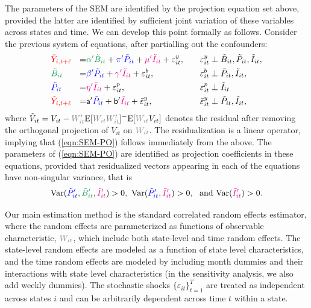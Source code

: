 \documentclass[11pt,reqno,letter]{amsart}
\theoremstyle{definition}
\providecommand{\Var}{{\mathrm{Var}}}
\newcommand{\Ep}{{\mathrm{E}}}
\def\bcolor{\color{ForestGreen}}
\def\pcolor{\color{blue}}
\def\icolor{\color{magenta}}
\def\wcolor{\color{gray}}
\def\ycolor{\color{red}}
\begin{document}
The parameters of the SEM are identified by the projection equation set above, provided the latter are identified by sufficient joint variation of these variables across states and time. We can develop this point formally as follows. Consider the previous system of equations, after partialling out the confounders:
\begin{equation}\label{eqn:SEM-PO}
 \begin{aligned}
   & {\ycolor { \tilde Y_{i,t+\ell}}}  & =& {\bcolor {\alpha ' \tilde B_{it}}} +{\pcolor {\pi '\tilde P_{it}}} +{\icolor \mu'\tilde I_{it} } + \varepsilon^y_{it},&\varepsilon^y_{it} &\perp {\tilde B_{it}}, {\tilde  P_{it}}, { \tilde I_{it}},  \\
   & {\bcolor { \tilde B_{it}}} & = &{\pcolor { \beta' \tilde P_{it}} } + {\icolor { \gamma' \tilde I_{it}} } + \varepsilon^b_{it},
   &\quad \varepsilon^b_{it} &\perp { \tilde P_{it}}, { \tilde I_{it}},  \\
   & {\pcolor { \tilde P_{it}} } &= &  {\icolor {\eta' \tilde I_{it}} } +   \varepsilon^p_{it}, &\quad \varepsilon^p_{it} &\perp {\tilde I_{it}}  \\
     & {\ycolor { \tilde Y_{i,t+\ell}}}  & =&  \mathsf{a} ' {\pcolor {\tilde P_{it}}} + \mathsf{b}' {\icolor \tilde I_{it} } + \bar \varepsilon^y_{it},&\bar \varepsilon^y_{it} &\perp  {\tilde  P_{it}}, { \tilde I_{it}},  \\
   \end{aligned}
\end{equation}
where $ \tilde V_{it} = V_{it}   -     {\wcolor W_{it}'} \Ep[{\wcolor W_{it}W_{it}'}]^{-} \Ep[{\wcolor W_{it}} V_{it}]$ denotes
the residual after removing the orthogonal projection of $V_{it}$ on ${\wcolor W_{it}}$. The residualization is a linear operator, implying that (\ref{eqn:SEM-PO}) follows immediately from the above. The parameters of (\ref{eqn:SEM-PO})  are identified as projection coefficients in these equations, provided that residualized vectors appearing in each of the equations have non-singular variance, that is
 \begin{equation}
 \Var ( {\pcolor \tilde P_{it}'} ,{\bcolor \tilde B_{it}'},{\icolor \tilde I_{it}'})>0,
 \ \Var ({\pcolor \tilde P_{it}'}, {\icolor \tilde I_{it}'})> 0 , \ \text{ and  }  \Var ( {\icolor \tilde I_{it}'}) >0.
 \end{equation}

Our main estimation method is the standard correlated random effects estimator, where the random effects
are parameterized as functions of observable characteristic, ${\wcolor W_{it}}$, which include both state-level and time random effects.  The state-level random effects
are modeled as a function of state level characteristics, and the time random effects are modeled
by including month dummies and their interactions with state level characteristics (in the sensitivity analysis,
we also add weekly dummies).  The stochastic shocks $\{ \varepsilon_{it}\}_{t=1}^T$ are treated as independent across states $i$ and can be arbitrarily dependent across time $t$ within a state.
\end{document}
